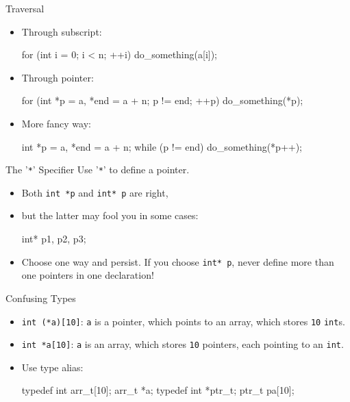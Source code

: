 \documentclass{beamer}
\newcommand{\ttt}[1]{\texttt{#1}}
\begin{document}
\begin{frame}[fragile]{Traversal}
	\begin{itemize}
		\item Through subscript:
		\begin{cpp}
for (int i = 0; i < n; ++i)
  do_something(a[i]);
		\end{cpp}
		\item Through pointer:
		\begin{cpp}
for (int *p = a, *end = a + n; p != end; ++p)
  do_something(*p);
		\end{cpp}
		\pause
		\item More fancy way:
		\begin{cpp}
int *p = a, *end = a + n;
while (p != end)
  do_something(*p++);
		\end{cpp}
	\end{itemize}
\end{frame}

\begin{frame}[fragile]{The '\ttt{*}' Specifier}
	Use '\ttt{*}' to define a pointer.
	\begin{itemize}
		\item Both \ttt{int *p} and \ttt{int* p} are right,
		\pause
		\item but the latter may fool you in some cases:
		\begin{cpp}
int* p1, p2, p3;
		\end{cpp}
		\pause
		\item Choose one way and persist. If you choose \ttt{int* p}, never define more than one pointers in one declaration!
	\end{itemize}
\end{frame}

\begin{frame}[fragile]{Confusing Types}
	\begin{itemize}
		\item \ttt{int (*a)[10]}: \ttt{a} is a pointer, which points to an array, which stores \ttt{10} \ttt{int}s.
		\item \ttt{int *a[10]}: \ttt{a} is an array, which stores \ttt{10} pointers, each pointing to an \ttt{int}.
		\pause
		\item Use type alias:
		\begin{cpp}
typedef int arr_t[10];
arr_t *a;
typedef int *ptr_t;
ptr_t pa[10];
		\end{cpp}
	\end{itemize}
\end{frame}
\end{document}
